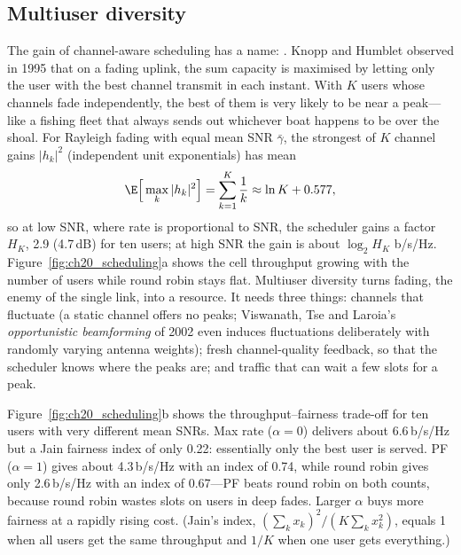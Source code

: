 \subsection{Multiuser diversity}

The gain of channel-aware scheduling has a name: . Knopp and Humblet observed in 1995 that
on a fading uplink, the sum capacity is maximised by letting only the user with the best channel transmit in each
instant. With $K$ users whose channels fade independently, the best of them is very likely to be near a peak---like
a fishing fleet that always sends out whichever boat happens to be over the shoal. For Rayleigh fading with equal mean
SNR $\bar\gamma$, the strongest of $K$ channel gains $|h_k|^2$ (independent unit exponentials) has mean
\begin{equation}
\E\Big[\max_k|h_k|^2\Big]=\sum_{k=1}^{K}\frac1k\approx\ln K+0.577,
\end{equation}
so at low SNR, where rate is proportional to SNR, the scheduler gains a factor $H_K$, 2.9 (4.7\,dB) for ten users; at
high SNR the gain is about $\log_2H_K$ b/s/Hz. Figure~\ref{fig:ch20_scheduling}a shows the cell throughput growing with
the number of users while round robin stays flat. Multiuser diversity turns fading, the enemy of the single link,
into a resource. It needs three things: channels that fluctuate (a static channel offers no peaks; Viswanath, Tse and
Laroia's \emph{opportunistic beamforming} of 2002 even induces fluctuations deliberately with randomly varying
antenna weights); fresh channel-quality feedback, so that the scheduler knows where the peaks are; and traffic that can
wait a few slots for a peak.


Figure~\ref{fig:ch20_scheduling}b shows the throughput--fairness trade-off for ten users with very different mean SNRs.
Max rate ($\alpha=0$) delivers about 6.6\,b/s/Hz but a Jain fairness index of only 0.22: essentially only the best user is
served. PF ($\alpha=1$) gives about 4.3\,b/s/Hz with an index of 0.74, while round robin gives only 2.6\,b/s/Hz with an index of
0.67---PF beats round robin on both counts, because round robin wastes slots on users in deep fades. Larger $\alpha$ buys
more fairness at a rapidly rising cost. (Jain's index, $(\sum_kx_k)^2/(K\sum_kx_k^2)$, equals 1 when all users get the same
throughput and $1/K$ when one user gets everything.)

